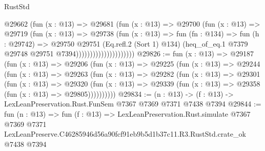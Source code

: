 \begin{lexlean}{RustStd}
\begin{coremodule}
                                @29662
                                  (fun (x : @13) =>
                                  @29681
                                    (fun (x : @13) =>
                                    @29700
                                      (fun (x : @13) =>
                                      @29719
                                        (fun (x : @13) =>
                                        @29738
                                          (fun (x : @13) =>
                                          fun (fn : @134) =>
                                          fun (h : @29742) =>
                                          @29750
                                            @29751
                                            (Eq.refl.{2} (Sort 1) @134)
                                            (heq_of_eq.{1}
                                              @7379
                                              @29748
                                              @29751
                                              @7394)))))))))))))))))))))
@29826 := fun (x : @13) =>
  @29187
    (fun (x : @13) =>
    @29206
      (fun (x : @13) =>
      @29225
        (fun (x : @13) =>
        @29244
          (fun (x : @13) =>
          @29263
            (fun (x : @13) =>
            @29282
              (fun (x : @13) =>
              @29301
                (fun (x : @13) =>
                @29320
                  (fun (x : @13) =>
                  @29339 (fun (x : @13) => @29358 (fun (x : @13) => @29805))))))))))
@29834 := (n : @13) -> (f : @13) -> LexLeanPreservation.Rust.FunSem @7367 @7369 @7371 @7438 @7394
@29844 := fun (n : @13) =>
  fun (f : @13) =>
  LexLeanPreservation.Rust.simulate
    @7367
    @7369
    @7371
    LexLeanPreserve.C46285946d56a90fcf91eb9b5d1b37c11.R3.RustStd.crate_ok
    @7438
    @7394
\end{coremodule}
\end{lexlean}
